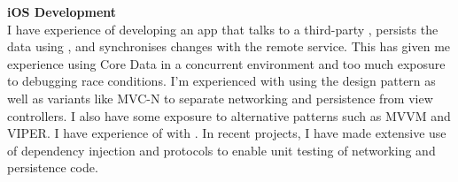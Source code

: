 \textbf{iOS Development}\\
I have experience of developing an app that talks to a third-party , persists the data using , and synchronises changes
with the remote service. This has given me experience using Core Data in a
concurrent environment and too much exposure to debugging race conditions. I'm
experienced with using the  design pattern as well as variants like
MVC-N to separate networking and persistence from view controllers. I also have
some exposure to alternative patterns such as MVVM and VIPER. I have experience
of  with . In recent projects, I have made
extensive use of dependency injection and protocols to enable unit testing of
networking and persistence code.

